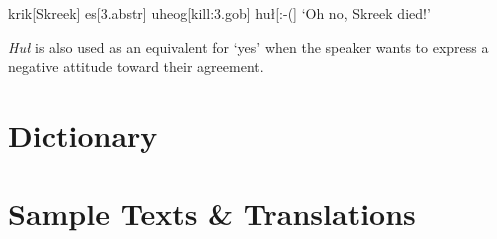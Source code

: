 \documentclass[a4paper,11pt,oneside,openany]{memoir}
\begin{document}
\ex 
\begingl
\vS krik[Skreek]
es[\sc 3.abstr]
uheog[kill:{\sc 3.gob}]
hu\l[:-{(}]
\glft `Oh no, Skreek died!'
\endgl
\xe

\textit{Hu\l} is also used as an equivalent for `yes' when the speaker wants to express a negative attitude toward their agreement.


\part{Dictionary}

\pagestyle{headings}
\nouppercaseheads



\part{Sample Texts \& Translations}
\end{document}
